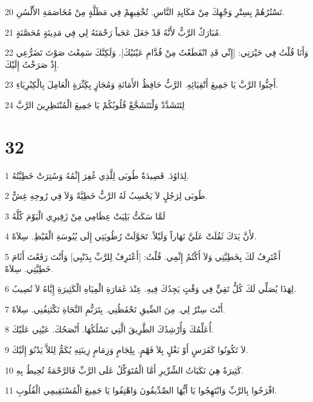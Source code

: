 \par 20 تَسْتُرُهُمْ بِسِتْرِ وَجْهِكَ مِنْ مَكَايِدِ النَّاسِ. تُخْفِيهِمْ فِي مَظَلَّةٍ مِنْ مُخَاصَمَةِ الأَلْسُنِ.
\par 21 مُبَارَكٌ الرَّبُّ لأَنَّهُ قَدْ جَعَلَ عَجَباً رَحْمَتَهُ لِي فِي مَدِينَةٍ مُحَصَّنَةٍ.
\par 22 وَأَنَا قُلْتُ فِي حَيْرَتِي: [إِنِّي قَدِ انْقَطَعْتُ مِنْ قُدَّامِ عَيْنَيْكَ]. وَلَكِنَّكَ سَمِعْتَ صَوْتَ تَضَرُّعِي إِذْ صَرَخْتُ إِلَيْكَ.
\par 23 أَحِبُّوا الرَّبَّ يَا جَمِيعَ أَتْقِيَائِهِ. الرَّبُّ حَافِظُ الأَمَانَةِ وَمُجَازٍ بِكَِثْرَةٍ الْعَامِلَ بِالْكِبْرِيَاءِ.
\par 24 لِتَتَشَدَّدْ وَلْتَتَشَجَّعْ قُلُوبُكُمْ يَا جَمِيعَ الْمُنْتَظِرِينَ الرَّبَّ

\chapter{32}

\par 1 لِدَاوُدَ. قَصِيدَةٌ طُوبَى لِلَّذِي غُفِرَ إِثْمُهُ وَسُتِرَتْ خَطِيَّتُهُ.
\par 2 طُوبَى لِرَجُلٍ لاَ يَحْسِبُ لَهُ الرَّبُّ خَطِيَّةً وَلاَ فِي رُوحِهِ غِشٌّ.
\par 3 لَمَّا سَكَتُّ بَلِيَتْ عِظَامِي مِنْ زَفِيرِي الْيَوْمَ كُلَّهُ
\par 4 لأَنَّ يَدَكَ ثَقُلَتْ عَلَيَّ نَهَاراً وَلَيْلاً. تَحَوَّلَتْ رُطُوبَتِي إِلَى يُبُوسَةِ الْقَيْظِ. سِلاَهْ.
\par 5 أَعْتَرِفُ لَكَ بِخَطِيَّتِي وَلاَ أَكْتُمُ إِثْمِي. قُلْتُ: [أَعْتَرِفُ لِلرَّبِّ بِذَنْبِي] وَأَنْتَ رَفَعْتَ أَثَامَ خَطِيَّتِي. سِلاَهْ.
\par 6 لِهَذَا يُصَلِّي لَكَ كُلُّ تَقِيٍّ فِي وَقْتٍ يَجِدُكَ فِيهِ. عِنْدَ غَمَارَةِ الْمِيَاهِ الْكَثِيرَةِ إِيَّاهُ لاَ تُصِيبُ.
\par 7 أَنْتَ سِتْرٌ لِي. مِنَ الضِّيقِ تَحْفَظُنِي. بِتَرَنُّمِ النَّجَاةِ تَكْتَنِفُنِي. سِلاَهْ.
\par 8 أُعَلِّمُكَ وَأُرْشِدُكَ الطَّرِيقَ الَّتِي تَسْلُكُهَا. أَنْصَحُكَ. عَيْنِي عَلَيْكَ.
\par 9 لاَ تَكُونُوا كَفَرَسٍ أَوْ بَغْلٍ بِلاَ فَهْمٍ. بِلِجَامٍ وَزِمَامٍ زِينَتِهِ يُكَمُّ لِئَلاَّ يَدْنُوَ إِلَيْكَ.
\par 10 كَثِيرَةٌ هِيَ نَكَبَاتُ الشِّرِّيرِ أَمَّا الْمُتَوَكِّلُ عَلَى الرَّبِّ فَالرَّحْمَةُ تُحِيطُ بِهِ.
\par 11 افْرَحُوا بِالرَّبِّ وَابْتَهِجُوا يَا أَيُّهَا الصِّدِّيقُونَ وَاهْتِفُوا يَا جَمِيعَ الْمُسْتَقِيمِي الْقُلُوبِ.

